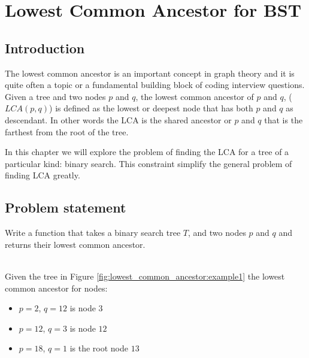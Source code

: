 %

\chapter{Lowest Common Ancestor for BST}
\label{ch:lowest_common_ancestor}
\section*{Introduction}
The lowest common ancestor is an important concept in graph theory and it is
quite often a topic or a fundamental building block of coding interview questions.
Given a tree and two nodes $p$ and $q$, the lowest common ancestor  of $p$ and $q$, ($LCA(p,q)$) is defined as the lowest or deepest node that has both $p$ and $q$ as descendant.
In other words the LCA is the shared ancestor or $p$ and $q$ that is the farthest from the root of the tree.

In this chapter we will explore the problem of finding the LCA for a tree of a particular kind: binary search. This constraint simplify the general problem of finding LCA greatly. 
\section{Problem statement}
\begin{exercise}
	Write a function that takes a binary search tree $T$, and two nodes $p$ and $q$ and returns their lowest common ancestor.

	\begin{example}
		\hfill \\
		Given the tree in Figure \ref{fig:lowest_common_ancestor:example1} the lowest common ancestor for nodes:
		\begin{itemize}
			\item $p = 2$, $q=12$ is node $3$
			\item $p = 12$, $q=3$ is node $12$
			\item $p = 18$, $q=1$ is the root node $13$
		\end{itemize}
		\label{ex:lower_common_ancestor:example1}
	\end{example}
\end{exercise}

